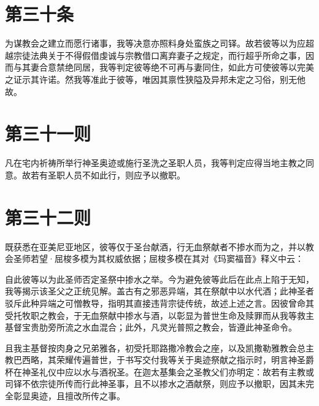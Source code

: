 
\section{第三十条}

为谋教会之建立而愿行诸事，我等决意亦照料身处蛮族之司铎。故若彼等以为应超越宗徒法典关于不得假借虔诚与宗教借口离弃妻子之规定，而行超乎所命之事，因而与其妻合意禁绝同居，我等判定彼等绝不可再与妻同住，如此方可使彼等以完美之证示其许诺。然我等准此于彼等，唯因其禀性狭隘及异邦未定之习俗，别无他故。\par


\section{第三十一则}

凡在宅内祈祷所举行神圣奥迹或施行圣洗之圣职人员，我等判定应得当地主教之同意。故若有圣职人员不如此行，则应予以撤职。\par


\section{第三十二则}

既获悉在亚美尼亚地区，彼等仅于圣台献酒，行无血祭献者不掺水而为之，并以教会圣师若望·屈梭多模为其权威依据；屈梭多模在其对《玛窦福音》释义中云：\par

自此彼等以为此圣师否定圣祭中掺水之举。今为避免彼等此后在此点上陷于无知，我等揭示该圣父之正统见解。盖古有之邪恶异端，其在祭献中以水代酒；此神圣者驳斥此种异端之可憎教导，指明其直接违背宗徒传统，故述上述之言。因彼曾命其受托牧职之教会，于无血祭献中掺水与酒，以彰显为普世生命及赎罪而从我等救主基督宝贵肋旁所流之水血混合；此外，凡灵光普照之教会，皆遵此神圣命令。\par

且我主基督按肉身之兄弟雅各，初受托耶路撒冷教会之座，以及凯撒勒雅教会总主教巴西略，其荣耀传遍普世，于书写交付我等关于奥迹祭献之指示时，明言神圣爵杯在神圣礼仪中应以水与酒祝圣。在迦太基集会之圣教父们亦明定：故若有主教或司铎不依宗徒所传而行此神圣事，且不以掺水之酒献祭，则应予以撤职，因其未完全彰显奥迹，且擅改所传之事。\par

